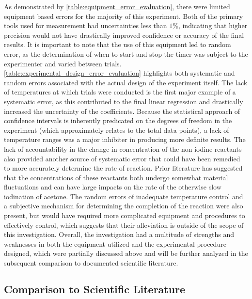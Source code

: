 As demonstrated by \cref{table:equipment_error_evaluation}, there were limited equipment based errors for the majority of this experiment. Both of the primary tools used for measurement had uncertainties less than $1\%$, indicating that higher precision would not have drastically improved confidence or accuracy of the final results. It is important to note that the use of this equipment led to random error, as the determination of when to start and stop the timer was subject to the experimenter and varied between trials. \cref{table:experimental_design_error_evaluation} highlights both systematic and random errors associated with the actual design of the experiment itself. The lack of temperatures at which trials were conducted is the first major example of a systematic error, as this contributed to the final linear regression and drastically increased the uncertainty of the coefficients. Because the statistical approach of confidence intervals is inherently predicated on the degrees of freedom in the experiment (which approximately relates to the total data points), a lack of temperature ranges was a major inhibiter in producing more definite results. The lack of accountability in the change in concentration of the non-iodine reactants also provided another source of systematic error that could have been remedied to more accurately determine the rate of reaction. Prior literature has suggested that the concentrations of these reactants both undergo somewhat material fluctuations and can have large impacts on the rate of the otherwise slow iodination of acetone. The random errors of inadequate temperature control and a subjective mechanism for determining the completion of the reaction were also present, but would have required more complicated equipment and procedures to effectively control, which suggests that their alleviation is outside of the scope of this investigation. Overall, the investigation had a multitude of strengths and weaknesses in both the equipment utilized and the experimental procedure designed, which were partially discussed above and will be further analyzed in the subsequent comparison to documented scientific literature.

\subsection{Comparison to Scientific Literature}

